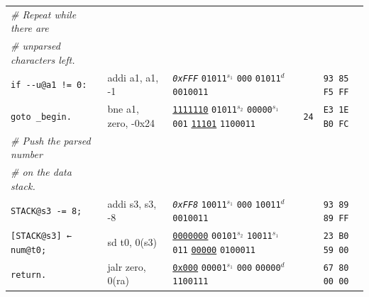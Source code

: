 \documentclass[a4paper,12pt,final]{article}
\begin{document}
\begin{table}[!htbp]
\begin{adjustwidth}{-1cm}{-1cm}
\begin{center}
\begin{tabular}{l|ll|l|l}
\hspace{1.053000em} \emph{\# Repeat while there are} &  &  &  & \\[0pt]
\hspace{1.053000em} \emph{\# unparsed characters left.} &  &  &  & \\[0pt]
\hspace{1.053000em} \texttt{if -{}-{}u@a1 != 0:} & addi a1, a1, -1 & \emph{\texttt{0xFFF}}                    \texttt{01011}​\(^{s_{1}}\) \texttt{000} \texttt{01011}​\(^{d}\)  \texttt{0010011} &  & \texttt{93 85 F5 FF}\\[0pt]
\hspace{2.106000em}   \texttt{goto \_begin.} & bne a1, zero, -0x24 & \uline{\texttt{1111110}} \texttt{01011}​\(^{s_{2}}\) \texttt{00000}​\(^{s_{1}}\) \texttt{001} \uline{\texttt{11101}} \texttt{1100011} & \texttt{24} & \texttt{E3 1E B0 FC}\\[0pt]
\hspace{1.053000em} \emph{\# Push the parsed number} &  &  &  & \\[0pt]
\hspace{1.053000em} \emph{\# on the data stack.} &  &  &  & \\[0pt]
\hspace{1.053000em} \texttt{STACK@s3 -= 8;} & addi s3, s3, -8 & \emph{\texttt{0xFF8}}                    \texttt{10011}​\(^{s_{1}}\) \texttt{000} \texttt{10011}​\(^{d}\)  \texttt{0010011} &  & \texttt{93 89 89 FF}\\[0pt]
\hspace{1.053000em} \texttt{[STACK@s3] ← num@t0;} & sd t0, 0(s3) & \uline{\texttt{0000000}} \texttt{00101}​\(^{s_{2}}\) \texttt{10011}​\(^{s_{1}}\) \texttt{011} \uline{\texttt{00000}} \texttt{0100011} &  & \texttt{23 B0 59 00}\\[0pt]
\hspace{1.053000em} \texttt{return.} & jalr zero, 0(ra) & \uline{\texttt{0x000}}                    \texttt{00001}​\(^{s_{1}}\) \texttt{000} \texttt{00000}​\(^{d}\)  \texttt{1100111} &  & \texttt{67 80 00 00}\\[0pt]
\end{tabular}

\end{center}
\normalsize \end{adjustwidth} \end{table} \vspace{0}
\end{document}
